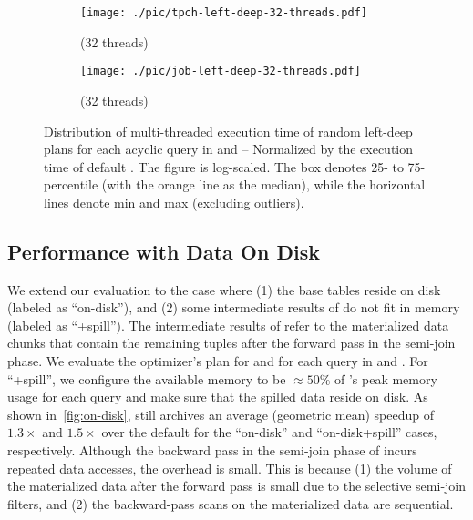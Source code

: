 \begin{figure*}[t!]
    \centering
    \begin{subfigure}{0.37\linewidth}
        \texttt{[image: ./pic/tpch-left-deep-32-threads.pdf]}
        \caption{\tpch (32 threads)}
        \label{fig:eval-32-threads-tpch}
    \end{subfigure}
    \begin{subfigure}{0.62\linewidth}
        \texttt{[image: ./pic/job-left-deep-32-threads.pdf]}
        \caption{\job (32 threads)}
        \label{fig:eval-32-threads-job}
    \end{subfigure}
    \caption{Distribution of multi-threaded execution time of random left-deep plans for each acyclic query in \tpch and \job \textnormal{-- Normalized by the execution time of default \duckdb. The figure is log-scaled. The box denotes 25- to 75-percentile (with the orange line as the median), while the horizontal lines denote min and max (excluding outliers).}}
    \label{fig:eval-32-threads}
\end{figure*}

\subsection{Performance with Data On Disk}
\label{sec:eval:on-disk}

We extend our evaluation to the case where (1) the base tables reside on disk (labeled as ``on-disk''), and (2) some intermediate results of \rpt do not fit in memory (labeled as ``+spill''). The intermediate results of \rpt refer to the materialized data chunks that contain the remaining tuples after the forward pass in the semi-join phase. We evaluate the optimizer's plan for \duckdb and \rpt for each query in \tpch and \job. For ``+spill'', we configure the available memory to be $\approx50\%$ of \rpt's peak memory usage for each query and make sure that the spilled data reside on disk. As shown in~\cref{fig:on-disk}, \rpt still archives an average (geometric mean) speedup of $1.3\times$ and $1.5\times$ over the default \duckdb for the ``on-disk'' and ``on-disk+spill'' cases, respectively. Although the backward pass in the semi-join phase of \rpt incurs repeated data accesses, the overhead is small. This is because (1) the volume of the materialized data after the forward pass is small due to the selective semi-join filters, and (2) the backward-pass scans on the materialized data are sequential.

